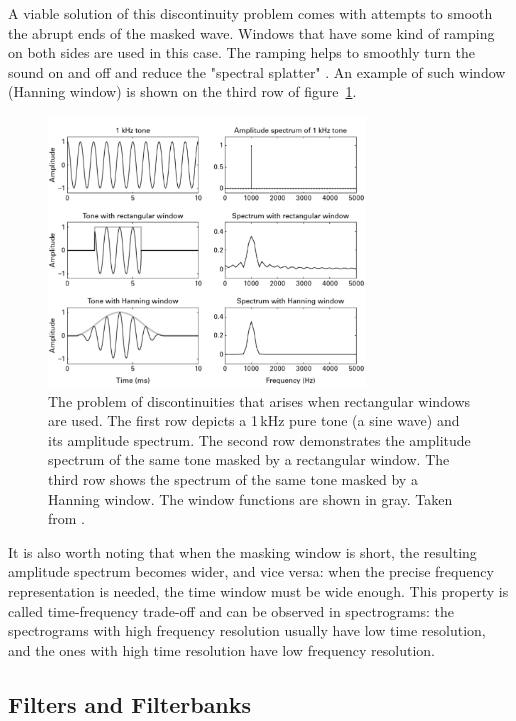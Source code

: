 A viable solution of this discontinuity problem comes with attempts to smooth the abrupt ends of the masked wave. Windows that have some kind of ramping on both sides are used in this case. The ramping helps to smoothly turn the sound on and off and reduce the "spectral splatter" \cite{Schnupp2011}. An example of such window (Hanning window) is shown on the third row of fi\-gure~\ref{img:windowing_example}.\\

\begin{figure}[t]
	\centering
	\includegraphics[width=0.75\textwidth]{include/windowing_example}
	\caption[An example of windowing and the problem of discontinuities]{The problem of discontinuities that arises when rectangular windows are used. The first row depicts a 1\,kHz pure tone (a sine wave) and its amplitude spectrum. The second row demonstrates the amplitude spectrum of the same tone masked by a rectangular window. The third row shows the spectrum of the same tone masked by a Hanning window. The window functions are shown in gray. Taken from \cite{Schnupp2011}.}
	\label{img:windowing_example}
\end{figure}

It is also worth noting that when the masking window is short, the resulting amplitude spectrum becomes wider, and vice versa: when the precise frequency representation is needed, the time window must be wide enough. This property is called time-frequency trade-off and can be observed in spectrograms: the spectrograms with high frequency resolution usually have low time resolution, and the ones with high time resolution have low frequency resolution.

\subsection{Filters and Filterbanks}\label{section:math_filters}

